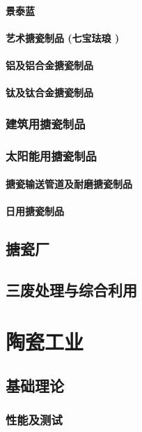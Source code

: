 \documentclass[UTF8]{../../ApplicationUniverse}
\begin{document}
        \subsubsection{景泰蓝}
        \subsubsection{艺术搪瓷制品 (七宝珐琅 )}
        \subsubsection{铝及铝合金搪瓷制品}
        \subsubsection{钛及钛合金搪瓷制品}
    \subsection{建筑用搪瓷制品}
    \subsection{太阳能用搪瓷制品}
        \subsubsection{搪瓷输送管道及耐磨搪瓷制品}
        \subsubsection{日用搪瓷制品}
\section{搪瓷厂}
\section{三废处理与综合利用}









\chapter{陶瓷工业}
\section{基础理论}
    \subsection{性能及测试}
\end{document}
